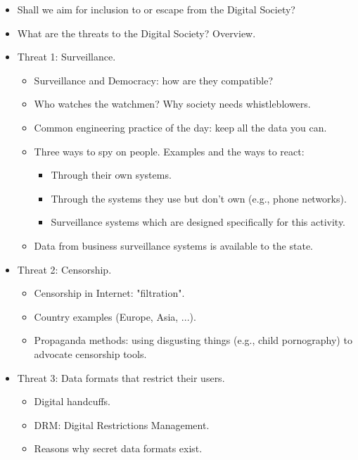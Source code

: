 \documentclass[twoside,openright]{report}
\begin{document}
\begin{itemize}
  \item     Shall we aim for inclusion to or escape from the Digital Society?
  \item     What are the threats to the Digital Society? Overview.
  \item     Threat 1: Surveillance.
\begin{itemize}
  \item         Surveillance and Democracy: how are they compatible?
  \item         Who watches the watchmen? Why society needs whistleblowers.
  \item         Common engineering practice of the day: keep all the data you can.
  \item         Three ways to spy on people. Examples and the ways to react:
\begin{itemize}
  \item             Through their own systems.
  \item             Through the systems they use but don't own (e.g., phone networks).
  \item             Surveillance systems which are designed specifically for this activity.
\end{itemize}
  \item         Data from business surveillance systems is available to the state.
\end{itemize}
  \item     Threat 2: Censorship.
\begin{itemize}
  \item         Censorship in Internet: "filtration".
  \item         Country examples (Europe, Asia, ...).
  \item         Propaganda methods: using disgusting things (e.g., child pornography) to advocate censorship tools.
\end{itemize}
  \item     Threat 3: Data formats that restrict their users.
\begin{itemize}
  \item         Digital handcuffs.
  \item         DRM: Digital Restrictions Management.
  \item         Reasons why secret data formats exist.
\end{itemize}
\end{itemize}
\end{document}
